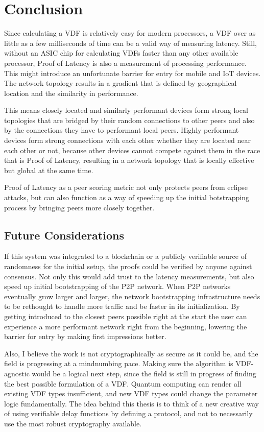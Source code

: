 \chapter{Conclusion}
\label{Conclusion}
Since calculating a VDF is relatively easy for modern processors, a VDF over as little as a few milliseconds of time can be a valid way of measuring latency. Still, without an ASIC chip for calculating VDFs faster than any other available processor, Proof of Latency is also a measurement of processing performance. This might introduce an unfortunate barrier for entry for mobile and IoT devices. The network topology results in a gradient that is defined by geographical location and the similarity in performance.

This means closely located and similarly performant devices form strong local topologies that are bridged by their random connections to other peers and also by the connections they have to performant local peers. Highly performant devices form strong connections with each other whether they are located near each other or not, because other devices cannot compete against them in the race that is Proof of Latency, resulting in a network topology that is locally effective but global at the same time.

Proof of Latency as a peer scoring metric not only protects peers from eclipse attacks, but can also function as a way of speeding up the initial botstrapping process by bringing peers more closely together.

\section{Future Considerations}
If this system was integrated to a blockchain or a publicly verifiable source of randomness for the initial setup, the proofs could be verified by anyone against consensus. Not only this would add trust to the latency measurements, but also speed up initial bootstrapping of the P2P network. When P2P networks eventually grow larger and larger, the network bootstrapping infrastructure needs to be rethought to handle more traffic and be faster in its initialization. By getting introduced to the closest peers possible right at the start the user can experience a more performant network right from the beginning, lowering the barrier for entry by making first impressions better.

Also, I believe the work is not cryptographically as secure as it could be, and the field is progressing at a mindnumbing pace. Making sure the algorithm is VDF-agnostic would be a logical next step, since the field is still in progress of finding the best possible formulation of a VDF. Quantum computing can render all existing VDF types insufficient, and new VDF types could change the parameter logic fundamentally. The idea behind this thesis is to think of a new creative way of using verifiable delay functions by defining a protocol, and not to necessarily use the most robust cryptography available.
